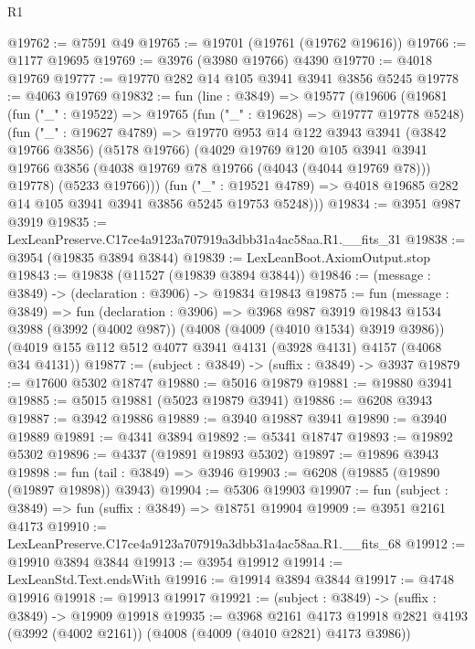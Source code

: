 \begin{lexlean}{R1}
\begin{coremodule}
@19762 := @7591 @49
@19765 := @19701 (@19761 (@19762 @19616))
@19766 := @1177 @19695
@19769 := @3976 (@3980 @19766) @4390
@19770 := @4018 @19769
@19777 := @19770 @282 @14 @105 @3941 @3941 @3856 @5245
@19778 := @4063 @19769
@19832 := fun (line : @3849) =>
  @19577
    (@19606
      (@19681
        (fun ("_" : @19522) =>
        @19765
          (fun ("_" : @19628) => @19777 @19778 @5248)
          (fun ("_" : @19627 @4789) =>
          @19770
            @953
            @14
            @122
            @3943
            @3941
            (@3842 @19766 @3856)
            (@5178 @19766)
            (@4029
              @19769
              @120
              @105
              @3941
              @3941
              @19766
              @3856
              (@4038 @19769 @78 @19766 (@4043 (@4044 @19769 @78)))
              @19778)
            (@5233 @19766)))
        (fun ("_" : @19521 @4789) =>
        @4018 @19685 @282 @14 @105 @3941 @3941 @3856 @5245 @19753 @5248)))
@19834 := @3951 @987 @3919
@19835 := LexLeanPreserve.C17ce4a9123a707919a3dbb31a4ac58aa.R1.__fits_31
@19838 := @3954 (@19835 @3894 @3844)
@19839 := LexLeanBoot.AxiomOutput.stop
@19843 := @19838 (@11527 (@19839 @3894 @3844))
@19846 := (message : @3849) -> (declaration : @3906) -> @19834 @19843
@19875 := fun (message : @3849) =>
  fun (declaration : @3906) =>
  @3968
    @987
    @3919
    @19843
    @1534
    @3988
    (@3992 (@4002 @987))
    (@4008 (@4009 (@4010 @1534) @3919 @3986))
    (@4019 @155 @112 @512 @4077 @3941 @4131 (@3928 @4131) @4157 (@4068 @34 @4131))
@19877 := (subject : @3849) -> (suffix : @3849) -> @3937
@19879 := @17600 @5302 @18747
@19880 := @5016 @19879
@19881 := @19880 @3941
@19885 := @5015 @19881 (@5023 @19879 @3941)
@19886 := @6208 @3943
@19887 := @3942 @19886
@19889 := @3940 @19887 @3941
@19890 := @3940 @19889
@19891 := @4341 @3894
@19892 := @5341 @18747
@19893 := @19892 @5302
@19896 := @4337 (@19891 @19893 @5302)
@19897 := @19896 @3943
@19898 := fun (tail : @3849) => @3946
@19903 := @6208 (@19885 (@19890 (@19897 @19898)) @3943)
@19904 := @5306 @19903
@19907 := fun (subject : @3849) => fun (suffix : @3849) => @18751 @19904
@19909 := @3951 @2161 @4173
@19910 := LexLeanPreserve.C17ce4a9123a707919a3dbb31a4ac58aa.R1.__fits_68
@19912 := @19910 @3894 @3844
@19913 := @3954 @19912
@19914 := LexLeanStd.Text.endsWith
@19916 := @19914 @3894 @3844
@19917 := @4748 @19916
@19918 := @19913 @19917
@19921 := (subject : @3849) -> (suffix : @3849) -> @19909 @19918
@19935 := @3968
    @2161
    @4173
    @19918
    @2821
    @4193
    (@3992 (@4002 @2161))
    (@4008 (@4009 (@4010 @2821) @4173 @3986))

\end{coremodule}
\end{lexlean}
